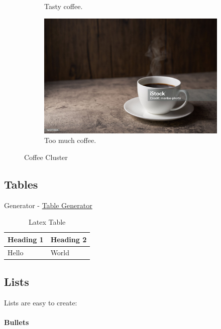 \documentclass{article}[a4paper,12pt]
\begin{document}
\begin{figure}[h!]
\begin{subfigure}[b]{0.2\linewidth}
    \caption{Tasty coffee.}
  \end{subfigure}
  \begin{subfigure}[b]{0.5\linewidth}
    \includegraphics[width=\linewidth]{coffee.jpg}
    \caption{Too much coffee.}
  \end{subfigure}
  \caption{Coffee Cluster}
  \label{fig:coffee3}
\end{figure}

\subsection{Tables}

Generator - \href{https://tableconvert.com/latex-generator}{Table Generator}

\begin{table}[!ht]
  \centering
  \caption{Latex Table}
  \begin{tabular}{|l|l|}
  \hline
      \textbf{Heading 1} & \textbf{Heading 2} \\ \hline
      Hello & World \\ \hline
  \end{tabular}
  \label{tab:latex}
\end{table}

\subsection{Lists}
Lists are easy to create:
\paragraph{Bullets}
\end{document}
